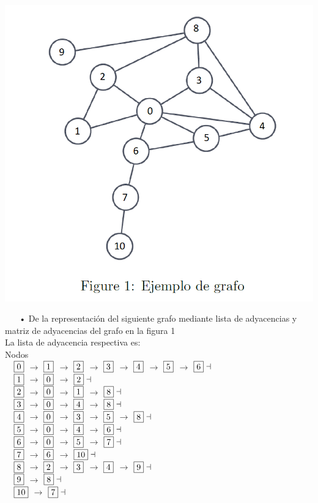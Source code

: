 \documentclass[a4paper,12pt]{article}
\begin{document}
\begin{center}
\par \includegraphics[scale=0.8]{f1} \par
\end{center}

$ ~~~~~~ $ • De la representación del siguiente grafo mediante lista de adyacencias y matriz de adyacencias del grafo en la figura 1 \\

La lista de adyacencia respectiva es:\\

Nodos\\
$~~~\fbox{0}$ $\to$ $\fbox{1}$ $\to$ $\fbox{2}$ $\to$ $\fbox{3}$ $\to$ $\fbox{4}$ $\to$ $\fbox{5}$ $\to$ $\fbox{6} \dashv$ \\
$~~~\fbox{1}$ $\to$ $\fbox{0}$ $\to$ $\fbox{2} \dashv$ \\
$~~~\fbox{2}$ $\to$ $\fbox{0}$ $\to$ $\fbox{1}$ $\to$ $\fbox{8} \dashv$ \\
$~~~\fbox{3}$ $\to$ $\fbox{0}$ $\to$ $\fbox{4}$ $\to$ $\fbox{8} \dashv$ \\
$~~~\fbox{4}$ $\to$ $\fbox{0}$ $\to$ $\fbox{3}$ $\to$ $\fbox{5}$ $\to$ $\fbox{8} \dashv$ \\
$~~~\fbox{5}$ $\to$ $\fbox{0}$ $\to$ $\fbox{4}$ $\to$ $\fbox{6} \dashv$ \\
$~~~\fbox{6}$ $\to$ $\fbox{0}$ $\to$ $\fbox{5}$ $\to$ $\fbox{7} \dashv$ \\
$~~~\fbox{7}$ $\to$ $\fbox{6}$ $\to$ $\fbox{10} \dashv$ \\
$~~~\fbox{8}$ $\to$ $\fbox{2}$ $\to$ $\fbox{3}$ $\to$ $\fbox{4}$ $\to$ $\fbox{9} \dashv$ \\
$~~~\fbox{9}$ $\to$ $\fbox{8} \dashv$ \\
$~~~\fbox{10}$ $\to$ $\fbox{7} \dashv$\\
\end{document}
